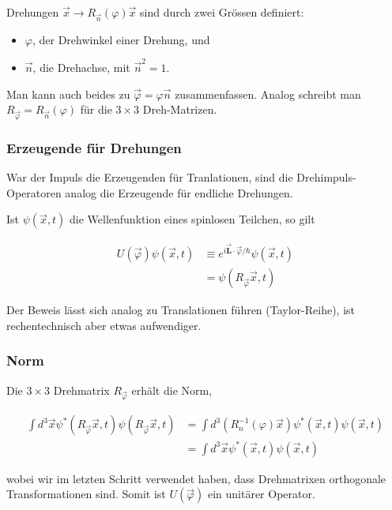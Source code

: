 \documentclass[10pt, letterpaper]{article}
\begin{document}
Drehungen $\vec{x} \rightarrow R_{\vec{n}}(\varphi) \vec{x}$ sind durch zwei Grössen definiert:

\begin{itemize}
  \item $\varphi$, der Drehwinkel einer Drehung, und
  \item $\vec{n}$, die Drehachse, mit $\vec{n}^{2}=1$.
\end{itemize}

Man kann auch beides zu $\vec{\varphi}=\varphi \vec{n}$ zusammenfassen. Analog schreibt man $R_{\vec{\varphi}}=R_{\vec{n}}(\varphi)$ für die $3 \times 3$ Dreh-Matrizen.

\subsubsection*{Erzeugende für Drehungen}
War der Impuls die Erzeugenden für Tranlationen, sind die Drehimpuls-Operatoren analog die Erzeugende für endliche Drehungen.

Ist $\psi(\vec{x}, t)$ die Wellenfunktion eines spinlosen Teilchen, so gilt

$$
\begin{aligned}
U(\vec{\varphi}) \psi(\vec{x}, t) & \equiv e^{i \overrightarrow{\mathbf{L}} \cdot \vec{\varphi} / \hbar} \psi(\vec{x}, t) \\
& =\psi\left(R_{\vec{\varphi}} \vec{x}, t\right)
\end{aligned}
$$

Der Beweis lässt sich analog zu Translationen führen (Taylor-Reihe), ist rechentechnisch aber etwas aufwendiger.

\subsubsection*{Norm}
Die $3 \times 3$ Drehmatrix $R_{\vec{\varphi}}$ erhält die Norm,

$$
\begin{aligned}
\int d^{3} \vec{x} \psi^{*}\left(R_{\vec{\varphi}} \vec{x}, t\right) \psi\left(R_{\vec{\varphi}} \vec{x}, t\right) & =\int d^{3}\left(R_{n}^{-1}(\varphi) \vec{x}\right) \psi^{*}(\vec{x}, t) \psi(\vec{x}, t) \\
& =\int d^{3} \vec{x} \psi^{*}(\vec{x}, t) \psi(\vec{x}, t)
\end{aligned}
$$

wobei wir im letzten Schritt verwendet haben, dass Drehmatrixen orthogonale Transformationen sind. Somit ist $U(\vec{\varphi})$ ein unitärer Operator.
\end{document}
